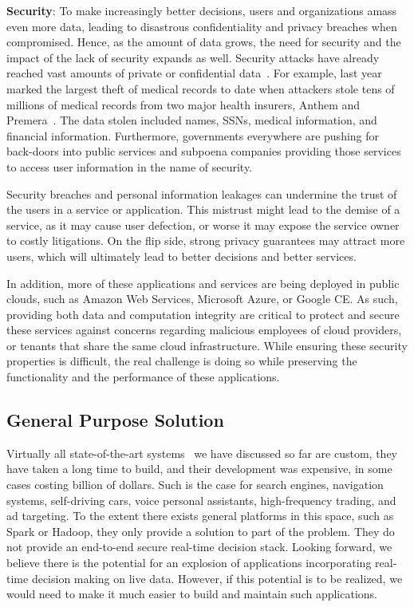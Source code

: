 {\bf Security}: To make increasingly better decisions, users and organizations amass even more data, leading to  disastrous confidentiality and privacy breaches when compromised. Hence, as the amount of data grows, the need for security and the impact of the lack of security expands as well. Security attacks have already reached vast amounts of private or confidential data~\cite{breaches2015}. For example, last year marked the largest theft of medical records to date when attackers stole tens of millions of medical records from two major health insurers, Anthem and Premera~\cite{AnthemBreach,AnthemLargest}. 
The data stolen included names, SSNs, medical information, and financial information. Furthermore, governments everywhere are pushing for back-doors into public services and subpoena companies providing those services to access user information in the name of security. 

Security breaches and personal information leakages can undermine the trust of the users in a service or application. This mistrust might lead to the demise of a service, as it may cause user defection, or worse it may expose the service owner to costly litigations. On the flip side, strong privacy guarantees may attract more users, which will ultimately lead to better decisions and better services. 

In addition, more of these applications and services are being deployed in public clouds, such as Amazon Web Services, Microsoft Azure, or Google CE. As such, providing both data and computation integrity are critical to protect and secure these services against concerns regarding malicious employees of cloud providers, or tenants that share the same cloud infrastructure. While ensuring these security properties is difficult, the real challenge is doing so while preserving the functionality and the performance of these applications.

\subsection{General Purpose Solution}

Virtually all state-of-the-art systems~\cite{Agarwal14, Graepel10, Ganjam15}  we have discussed so far are custom, they have taken a long time to build, and their development was expensive, in some cases costing billion of dollars. Such is the case for search engines, navigation systems, self-driving cars, voice personal assistants, high-frequency trading, and ad targeting. To the extent there exists general platforms in this space, such as Spark or Hadoop, they only provide a solution to part of the problem. They do not  provide an end-to-end secure real-time decision stack. Looking forward, we believe there is the potential for an explosion of applications incorporating real-time decision making on live data. However, if this potential is to be realized, we would need to make it much easier to build and maintain such applications. 

